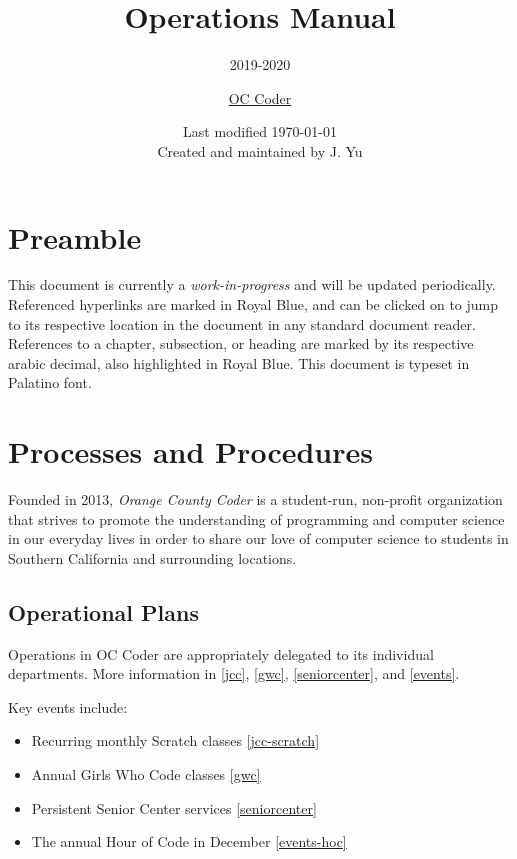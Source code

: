 \documentclass[twoside,11pt,letterpaper,abstracton]{scrartcl}
\title{Operations Manual}
\subtitle{2019-2020}
\author{\normalsize{\href{https://occoder.org}{OC Coder}}}
\date{\normalsize{Last modified \today \\ \small{Created and maintained by J. Yu}}}
\begin{document}
\maketitle

\section*{Preamble}

This document is currently a \emph{work-in-progress} and will be updated periodically. Referenced hyperlinks are marked in \color{RoyalBlue} Royal Blue\color{Black}, and can be clicked on to jump to its respective location in the document in any standard document reader. References to a chapter, subsection, or heading are marked by its respective arabic decimal, also highlighted in \color{RoyalBlue} Royal Blue\color{Black}. This document is typeset in Palatino font.

\tableofcontents

\newpage

\section{Processes and Procedures}

Founded in 2013, \emph{Orange County Coder} is a student-run, non-profit organization that strives to promote the understanding of programming and computer science in our everyday lives in order to share our love of computer science to students in Southern California and  surrounding locations.

\subsection{Operational Plans}

Operations in OC Coder are appropriately delegated to its individual departments. More information in \ref{jcc}, \ref{gwc}, \ref{seniorcenter}, and \ref{events}.

Key events include:
\begin{itemize}
    \item Recurring monthly Scratch classes     \ref{jcc-scratch}
    \item Annual Girls Who Code classes         \ref{gwc}
    \item Persistent Senior Center services     \ref{seniorcenter}
    \item The annual Hour of Code in December   \ref{events-hoc}
\end{itemize}
\end{document}
